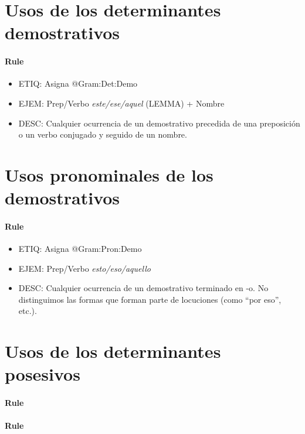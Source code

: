 \documentclass[11pt]{report}
\begin{document}
\section{Usos de los determinantes demostrativos}
\paragraph*{Rule}
\begin{itemize}
\item ETIQ: Asigna @Gram:Det:Demo
\item EJEM: Prep/Verbo \emph{este/ese/aquel} (LEMMA) + Nombre
\item DESC: Cualquier ocurrencia de un demostrativo precedida de una preposición o un verbo conjugado y seguido de un nombre.
\end{itemize}

\section{Usos pronominales de los demostrativos}
\paragraph*{Rule}
\begin{itemize}
\item ETIQ: Asigna @Gram:Pron:Demo
\item EJEM: Prep/Verbo \emph{esto/eso/aquello}
\item DESC: Cualquier ocurrencia de un demostrativo terminado en -o. No distinguimos las formas que forman parte de locuciones (como ``por eso'', etc.).
\end{itemize}

\section{Usos de los determinantes posesivos}
\paragraph*{Rule}
\paragraph*{Rule}
\end{document}
